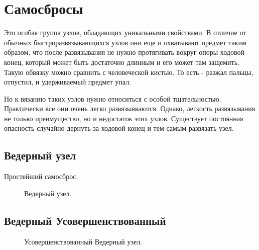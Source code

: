 \section{Самосбросы}

Это особая группа узлов, обладающих уникальными свойствами. В отличие от обычных быстроразвязывающихся узлов они еще и охватывают предмет таким образом, что после развязывания не нужно протягивать вокруг опоры ходовой конец, который может быть достаточно длинным и его может там защемить. Такую обвязку можно сравнить с человеческой кистью. То есть - разжал пальцы, отпустил, и удерживаемый предмет упал.

Но к вязанию таких узлов нужно относиться с особой тщательностью. Практически все они очень легко развязывваются. Однако, легкость развязывания не только преимущество, но и недостаток этих узлов. Существует постоянная опасность случайно дернуть за ходовой конец и тем самым развязать узел.

\subsection{Ведерный узел}

Простейший самосброс.

\begin{figure}[H]\centering
	\subfloat[Завязывание]{\label{ris:Vederny_1_1}
	\tcbox[enhanced jigsaw,colframe=black,opacityframe=0.5,opacityback=0.5]
		{\centering
			}
		}
\hfil
	\subfloat[Результат]{\label{ris:Vederny_1_2}
	\tcbox[enhanced jigsaw,colframe=black,opacityframe=0.5,opacityback=0.5]
		{\centering
			}
		}
	\caption{Ведерный узел.}\label{ris:Vederny_1}
\end{figure}

\subsection{Ведерный Усовершенствованный}

\begin{figure}[H]\centering
	\subfloat[Одинарный]{\label{ris:Vederny_2_1}
	\tcbox[enhanced jigsaw,colframe=black,opacityframe=0.5,opacityback=0.5,height=6cm]
		{\centering
			}
		}
\hfil
	\subfloat[Двойной]{\label{ris:Vederny_2_2}
	\tcbox[enhanced jigsaw,colframe=black,opacityframe=0.5,opacityback=0.5,height=6cm]
		{\centering
			}
		}
\hfil
	\caption{Усовершенствованный Ведерный узел.}\label{ris:Vederny_2}
\end{figure}

